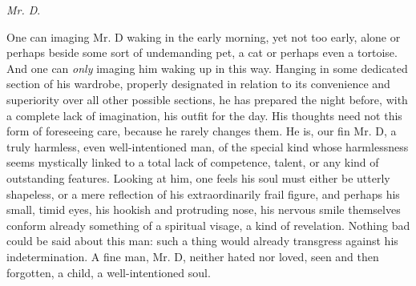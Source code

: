 \documentclass[a4paper, 12pt]{article}
\begin{document}
    
\textit{Mr. D}. 

One can imaging Mr. D waking in the early morning, yet not too early, alone or
perhaps beside some sort of undemanding pet, a cat or perhaps even a tortoise. 
And one can \textit{only} imaging him waking up in this way. Hanging in some
dedicated section of his wardrobe, properly designated in relation to its
convenience and superiority over all other possible sections, he has prepared
the night before, with a complete lack of imagination, his outfit for
the day. His thoughts need not this form of foreseeing care, because he rarely
changes them. He is, our fin Mr. D, a truly harmless, even well-intentioned man, of
the special kind whose harmlessness seems mystically linked to a total lack of
competence, talent, or any kind of outstanding features. Looking at him, one
feels his soul must either be utterly shapeless, or a mere reflection of his
extraordinarily frail figure, and perhaps his small, timid eyes, his hookish and
protruding nose, his nervous smile themselves conform already something of a
spiritual visage, a kind of revelation. Nothing bad could be said about this
man: such a thing would already transgress against his indetermination. A fine
man, Mr. D, neither hated nor loved, seen and then forgotten, a child, a
well-intentioned soul.
\end{document}
